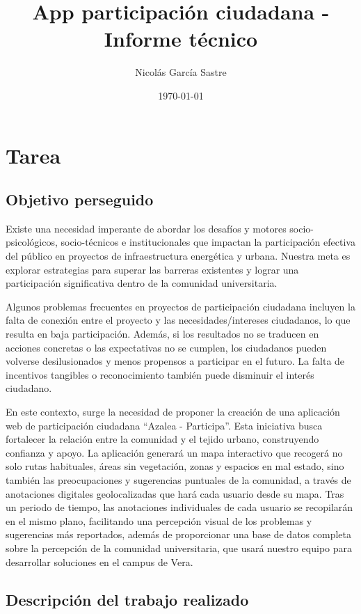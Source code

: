 \documentclass{article}
\title{App participación ciudadana - Informe técnico}
\author{Nicolás García Sastre}
\date{\today}
\begin{document}
 


\tableofcontents

\newpage

\section{Tarea}

\subsection{Objetivo perseguido}
Existe una necesidad imperante de abordar los desafíos y motores socio-psicológicos, socio-técnicos e institucionales que impactan la participación efectiva del público en proyectos de infraestructura energética y urbana. Nuestra meta es explorar estrategias para superar las barreras existentes y lograr una participación significativa dentro de la comunidad universitaria. 

Algunos problemas frecuentes en proyectos de participación ciudadana incluyen la falta de conexión entre el proyecto y las necesidades/intereses ciudadanos, lo que resulta en baja participación. Además, si los resultados no se traducen en acciones concretas o las expectativas no se cumplen, los ciudadanos pueden volverse desilusionados y menos propensos a participar en el futuro. La falta de incentivos tangibles o reconocimiento también puede disminuir el interés ciudadano.

En este contexto, surge la necesidad de proponer la creación de una aplicación web de participación ciudadana ``Azalea - Participa''. Esta iniciativa busca fortalecer la relación entre la comunidad y el tejido urbano, construyendo confianza y apoyo. La aplicación generará un mapa interactivo que recogerá no solo rutas habituales, áreas sin vegetación, zonas y espacios en mal estado, sino también las preocupaciones y sugerencias puntuales de la comunidad, a través de anotaciones digitales geolocalizadas que hará cada usuario desde su mapa. Tras un periodo de tiempo, las anotaciones individuales de cada usuario se recopilarán en el mismo plano, facilitando una percepción visual de los problemas y sugerencias más reportados, además de proporcionar una base de datos completa sobre la percepción de la comunidad universitaria, que usará nuestro equipo para desarrollar soluciones en el campus de Vera.

\subsection{Descripción del trabajo realizado}
\end{document}
